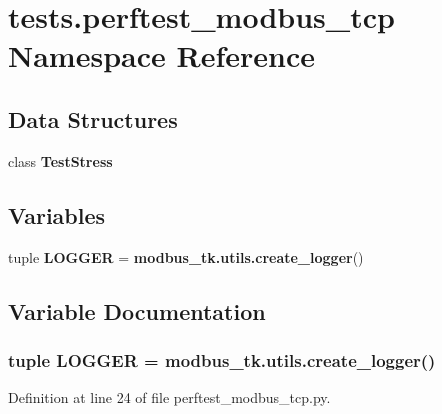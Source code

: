 \section{tests.\+perftest\+\_\+modbus\+\_\+tcp Namespace Reference}
\label{namespacetests_1_1perftest__modbus__tcp}
\subsection*{Data Structures}
\begin{DoxyCompactItemize}
\item 
class {\bf Test\+Stress}
\end{DoxyCompactItemize}
\subsection*{Variables}
\begin{DoxyCompactItemize}
\item 
tuple {\bf L\+O\+G\+G\+E\+R} = {\bf modbus\+\_\+tk.\+utils.\+create\+\_\+logger}()
\end{DoxyCompactItemize}


\subsection{Variable Documentation}
\subsubsection[{L\+O\+G\+G\+E\+R}]{\setlength{\rightskip}{0pt plus 5cm}tuple L\+O\+G\+G\+E\+R = {\bf modbus\+\_\+tk.\+utils.\+create\+\_\+logger}()}\label{namespacetests_1_1perftest__modbus__tcp_ae9c29667350ae00a0837fc1e77c279e2}


Definition at line 24 of file perftest\+\_\+modbus\+\_\+tcp.\+py.

